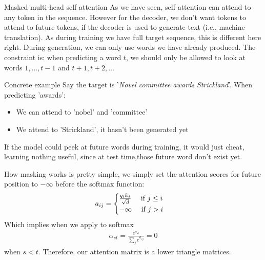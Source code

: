 \begin{parag}{Masked multi-head self attention}
    As we have seen, self-attention can attend to any token in the sequence. However for the decoder, we don't want tokens to attend to future tokens, if the decoder is used to generate text (i.e., machine translation). As during training we have full target sequence, this is different here right. During generation, we can only use words we have already produced. The constraint is: when predicting a word $t$, we should only be allowed to look at words $1, \ldots, t-1$ and  $t + 1, t+2, \ldots$
	\begin{subparag}{Concrete example}
		Say the target is '\textit{Novel committee awards Strickland}'. When predicting 'awards':
		\begin{itemize}
		    \item We can attend to 'nobel' and 'committee'
		    \item We  attend to 'Strickland', it hasn't been generated yet
		\end{itemize}
		If the model could peek at future words during training, it would just cheat, learning nothing useful, since at test time,those future word don't exist yet.
	\end{subparag}
	How masking works is pretty simple, we simply set the attention scores for future position to $-\infty$ before the softmax function:
	\begin{align*} 
		a_{ij} = \begin{cases}
			\frac{q_i k_j}{\sqrt{d}} \quad \text{ if } j \leq i\\
			-\infty \quad \text{ if } j > i
		\end{cases} 
	\end{align*}
	Which implies when we apply to softmax 
	\begin{align*} 
		\alpha_{st} = \frac{e^{a_{st}}}{\sum_{j}e^{a_{sj}}} = 0
	\end{align*}
	when $s < t$. Therefore, our attention matrix is a lower triangle matrices.
\end{parag}


